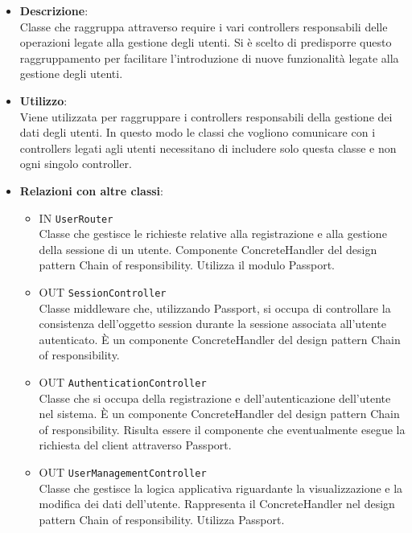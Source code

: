 \begin{itemize}
	\item 
	\textbf{Descrizione}:\\
	Classe che raggruppa attraverso require i vari controllers responsabili delle operazioni legate alla gestione degli utenti. Si è scelto di predisporre questo raggruppamento per facilitare l'introduzione di nuove funzionalità legate alla gestione degli utenti.
	\item \textbf{Utilizzo}:\\
	Viene utilizzata per raggruppare i controllers responsabili della gestione dei dati degli utenti. In questo modo le classi che vogliono comunicare con i controllers legati agli utenti necessitano di includere solo questa classe e non ogni singolo controller.
	\item \textbf{Relazioni con altre classi}:
	\begin{itemize}
		\item 
			IN	\texttt{UserRouter}\\
			Classe che gestisce le richieste relative alla registrazione e alla gestione della sessione di un utente. Componente ConcreteHandler del design pattern Chain of responsibility. Utilizza il modulo Passport.		
		\item 
			OUT \texttt{SessionController}\\
			Classe middleware che, utilizzando Passport, si occupa di controllare la consistenza dell'oggetto session durante la sessione associata all'utente autenticato. È un componente ConcreteHandler del design pattern Chain of responsibility.
		\item 
			OUT \texttt{AuthenticationController}\\
			Classe che si occupa della registrazione e dell'autenticazione dell'utente nel sistema. È un componente ConcreteHandler del design pattern Chain of responsibility. Risulta essere il componente che eventualmente esegue la richiesta del client attraverso Passport.	
		\item 
			OUT \texttt{UserManagementController}\\
			Classe che gestisce la logica applicativa riguardante la visualizzazione e la modifica dei dati dell'utente.
			Rappresenta il ConcreteHandler nel design pattern Chain of responsibility. Utilizza Passport.
	\end{itemize}
\end{itemize}
